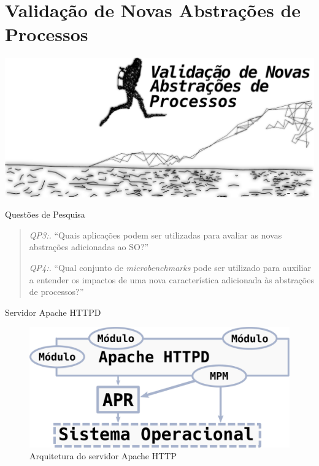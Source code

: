 \documentclass[xcolor={usenames,svgnames,dvipsnames},brazil,english,12pt,aspectratio=149]{beamer}
\begin{document}
\section{Validação de Novas Abstrações de Processos}

\begin{frame}[plain]
  \includegraphics[width=\textwidth]{presentation_cap3_sec1}
\end{frame}

\begin{frame}{Questões de Pesquisa}
  \begin{quote}
    \item \emph{QP3:.} ``Quais aplicações podem ser utilizadas para avaliar as novas abstrações adicionadas ao SO?''
    \item \emph{QP4:.} ``Qual conjunto de \emph{microbenchmarks} pode ser utilizado para auxiliar a entender os impactos de uma nova característica adicionada às abstrações de processos?''
  \end{quote}
\end{frame}

\begin{frame}{Servidor Apache HTTPD}
  \begin{figure}[!h]
    \centering
    \includegraphics[width=\textwidth]{apache_arhitecture} 
    \caption*{Arquitetura do servidor Apache HTTP}
  \end{figure}
\end{frame}
\end{document}
